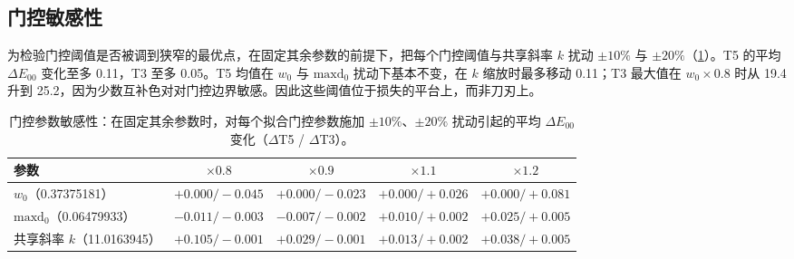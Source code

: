 \subsection{门控敏感性}
\label{sec:sensitivity}

为检验门控阈值是否被调到狭窄的最优点，在固定其余参数的前提下，把每个门控阈值与共享斜率 $k$ 扰动 $\pm10\%$ 与 $\pm20\%$（\cref{tab:sensitivity}）。T5 的平均 $\Delta E_{00}$ 变化至多 0.11，T3 至多 0.05。T5 均值在 $w_{0}$ 与 $\mathrm{maxd}_{0}$ 扰动下基本不变，在 $k$ 缩放时最多移动 0.11；T3 最大值在 $w_{0}\times0.8$ 时从 19.4 升到 25.2，因为少数互补色对对门控边界敏感。因此这些阈值位于损失的平台上，而非刀刃上。

\begin{table}[t]
\centering
\small
\caption{门控参数敏感性：在固定其余参数时，对每个拟合门控参数施加 $\pm10\%$、$\pm20\%$ 扰动引起的平均 $\Delta E_{00}$ 变化（$\Delta$T5 / $\Delta$T3）。}
\label{tab:sensitivity}
\begin{tabular}{lcccc}
\toprule
参数 & $\times0.8$ & $\times0.9$ & $\times1.1$ & $\times1.2$ \\
\midrule
$w_{0}$（0.37375181） & $+0.000/-0.045$ & $+0.000/-0.023$ & $+0.000/+0.026$ & $+0.000/+0.081$ \\
$\mathrm{maxd}_{0}$（0.06479933） & $-0.011/-0.003$ & $-0.007/-0.002$ & $+0.010/+0.002$ & $+0.025/+0.005$ \\
共享斜率 $k$（11.0163945） & $+0.105/-0.001$ & $+0.029/-0.001$ & $+0.013/+0.002$ & $+0.038/+0.005$ \\
\bottomrule
\end{tabular}
\end{table}
